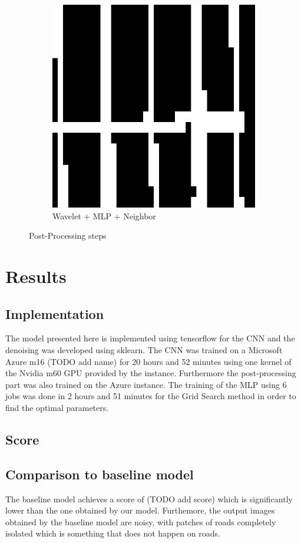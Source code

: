 \documentclass[10pt,conference,compsocconf]{IEEEtran}
\begin{document}
\begin{figure}
\begin{subfigure}{.3\columnwidth}
  \includegraphics[width=.8\linewidth]{final_res.png}
  \caption{Wavelet + MLP + Neighbor}
\end{subfigure}
\caption{Post-Processing steps}
\label{fig:denoising}
\end{figure}


\section{Results}
\label{sec:results}
\subsection{Implementation}
The model presented here is implemented using tensorflow for the CNN and the denoising was developed using sklearn. The CNN was trained on a Microsoft Azure m16 (TODO add name) for 20 hours and 52 minutes using one kernel of the Nvidia m60 GPU provided by the instance. Furthermore the post-processing part was also trained on the Azure instance. The training of the MLP using 6 jobs was done in 2 hours and 51 minutes for the Grid Search method in order to find the optimal parameters.
\subsection{Score}
\subsection{Comparison to baseline model}
The baseline model achieves a score of (TODO add score) which is significantly lower than the one obtained by our model. Furthemore, the output images obtained by the baseline model are noisy, with patches of roads completely isolated which is something that does not happen on roads.
\end{document}
